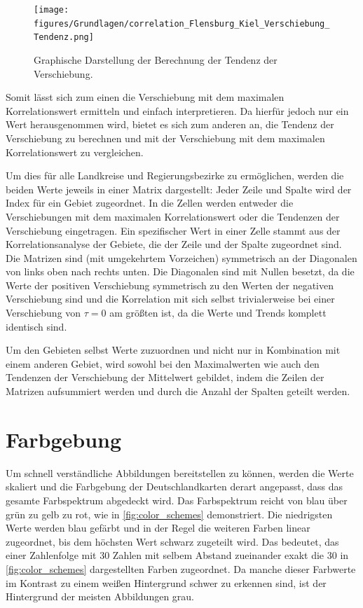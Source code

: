 \begin{figure}[H]
    \centering
    \texttt{[image: figures/Grundlagen/correlation\_Flensburg\_Kiel\_Verschiebung\_Tendenz.png]}
    \caption{Graphische Darstellung der Berechnung der Tendenz der Verschiebung.}
    \label{fig:Flensburg_Kiel_Verschiebung_Tendenz}
\end{figure}

Somit lässt sich zum einen die Verschiebung mit dem maximalen Korrelationswert ermitteln und einfach interpretieren.
Da hierfür jedoch nur ein Wert herausgenommen wird, bietet es sich zum anderen an, die Tendenz der Verschiebung zu berechnen und mit der Verschiebung mit dem maximalen Korrelationswert zu vergleichen.



Um dies für alle Landkreise und Regierungsbezirke zu ermöglichen, werden die beiden Werte jeweils in einer Matrix dargestellt: Jeder Zeile und Spalte wird der Index für ein Gebiet zugeordnet. In die Zellen werden entweder die Verschiebungen mit dem maximalen Korrelationswert oder die Tendenzen der Verschiebung eingetragen. Ein spezifischer Wert in einer Zelle stammt aus der Korrelationsanalyse der Gebiete, die der Zeile und der Spalte zugeordnet sind.
Die Matrizen sind (mit umgekehrtem Vorzeichen) symmetrisch an der Diagonalen von links oben nach rechts unten. Die Diagonalen sind mit Nullen besetzt, da die Werte der positiven Verschiebung symmetrisch zu den Werten der negativen Verschiebung sind und die Korrelation mit sich selbst trivialerweise bei einer Verschiebung von $\tau=0$ am größten ist, da die Werte und Trends komplett identisch sind.

Um den Gebieten selbst Werte zuzuordnen und nicht nur in Kombination mit einem anderen Gebiet, wird sowohl bei den Maximalwerten wie auch den Tendenzen der Verschiebung der Mittelwert gebildet, indem die Zeilen der Matrizen aufsummiert werden und durch die Anzahl der Spalten geteilt werden.
\section{Farbgebung}\label{sec:Grundlagen:Farbgebung}
Um schnell verständliche Abbildungen bereitstellen zu können, werden die Werte skaliert und die Farbgebung der Deutschlandkarten derart angepasst, dass das gesamte Farbspektrum abgedeckt wird. Das Farbspektrum reicht von blau über grün zu gelb zu rot, wie in \autoref{fig:color_schemes} demonstriert. Die niedrigsten Werte werden blau gefärbt und in der Regel die weiteren Farben linear zugeordnet, bis dem höchsten Wert schwarz zugeteilt wird.
Das bedeutet, das einer Zahlenfolge mit 30 Zahlen mit selbem Abstand zueinander exakt die 30 in \autoref{fig:color_schemes} dargestellten Farben zugeordnet.
Da manche dieser Farbwerte im Kontrast zu einem weißen Hintergrund schwer zu erkennen sind, ist der Hintergrund der meisten Abbildungen grau.

